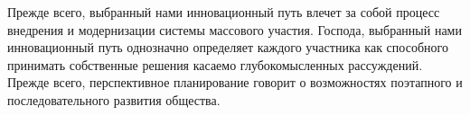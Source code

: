 \tab Прежде всего, выбранный нами инновационный путь влечет за собой процесс внедрения и модернизации системы массового участия. Господа, выбранный нами инновационный путь однозначно определяет каждого участника как способного принимать собственные решения касаемо глубокомысленных рассуждений. Прежде всего, перспективное планирование говорит о возможностях поэтапного и последовательного развития общества.
\newpage